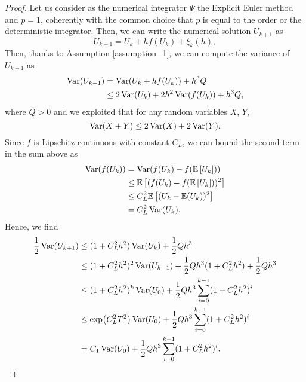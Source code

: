 \begin{proof} Let us consider as the numerical integrator $\Psi$ the Explicit Euler method and $p = 1$, coherently with the common choice that $p$ is equal to the order or the deterministic integrator. Then, we can write the numerical solution $U_{k+1}$ as
\begin{equation}
	U_{k+1} = U_k + hf(U_k) + \xi_k(h),
\end{equation}
Then, thanks to Assumption \ref{assumption_1}, we can compute the variance of $U_{k+1}$ as 
\begin{equation}\label{eq:indepProof}
	\begin{aligned}
		\operatorname{Var}(U_{k+1}) &= \operatorname{Var}(U_k + hf(U_k)) + h^3Q \\
		&\leq 2\operatorname{Var}(U_k) + 2h^2 \operatorname{Var}(f(U_k)) + h^3Q,
	\end{aligned}
\end{equation}
where $Q > 0$ and we exploited that for any random variables $X$, $Y$,
\begin{equation}\label{eq:varProp}
	\operatorname{Var}(X + Y) \leq 2\operatorname{Var}(X) + 2\operatorname{Var}(Y).
\end{equation}
Since $f$ is Lipschitz continuous with constant $C_L$, we can bound the second term in the sum above as
\begin{equation}\label{eq:lipschitzVar}
	\begin{aligned}
		\operatorname{Var}(f(U_k)) &= \operatorname{Var}(f(U_k) - f(\mathbb{E}\left[U_k\right])) \\
		&\leq \mathbb{E}\left[(f(U_k) - f(\mathbb{E}\left[U_k\right]))^2\right] \\
		&\leq C_L^2\mathbb{E}\left[(U_k - \mathbb{E}(U_k))^2\right] \\
		&= C_L^2 \operatorname{Var}(U_k).
	\end{aligned}
\end{equation}
Hence, we find
\begin{equation}
\begin{aligned}
	\frac{1}{2}\Var(U_{k+1}) &\leq (1 + C_L^2h^2)\Var(U_k) + \frac{1}{2}Q h^3 \\
	&\leq (1 + C_L^2h^2)^2 \Var(U_{k-1}) + \frac{1}{2}Q h^3 (1 + C_L^2h^2) + \frac{1}{2}Q h^3 \\
	&\leq (1 + C_L^2h^2)^k \Var(U_0) + \frac{1}{2}Q h^3 \sum_{i = 0}^{k - 1}(1 + C_L^2h^2)^i \\
	&\leq \exp(C_L^2T^2) \Var(U_0) + \frac{1}{2}Q h^3 \sum_{i = 0}^{k - 1}(1 + C_L^2h^2)^i \\
	&= C_1 \Var(U_0) + \frac{1}{2}Q h^3 \sum_{i = 0}^{k - 1}(1 + C_L^2h^2)^i. \\
\end{aligned}

\end{equation}
\end{proof}
